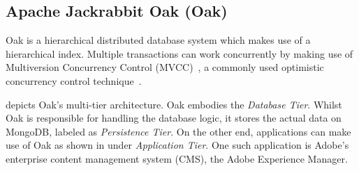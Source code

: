 \documentclass[abstracton,12pt]{scrartcl}
\theoremstyle{definition}
\begin{document}
\subsection{Apache Jackrabbit Oak (Oak)}

Oak is a hierarchical distributed database system which makes use of a hierarchical index. 
Multiple transactions can work concurrently by making use of Multiversion Concurrency Control (MVCC)~\cite{GW02}, a commonly used optimistic concurrency control technique~\cite{TM11}.

 depicts Oak's multi-tier architecture.
Oak embodies the \textit{Database Tier}.
Whilst Oak is responsible for handling the database logic, it stores the actual data on MongoDB, labeled as \textit{Persistence Tier}.
On the other end, applications can make use of Oak as shown in  under \textit{Application Tier}.
One such application is Adobe's enterprise content management system (CMS), the Adobe Experience Manager.
\end{document}
